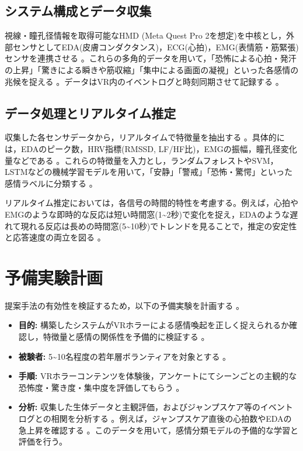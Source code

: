 \documentclass[paper=a4paper,fontsize=10pt,jafontscale=0.925,twocolumn]{jlreq}
\begin{document}
\subsection{システム構成とデータ収集}

視線・瞳孔径情報を取得可能なHMD (Meta Quest Pro 2を想定)を中核とし，外部センサとしてEDA(皮膚コンダクタンス)，ECG(心拍)，EMG(表情筋・筋緊張)センサを連携させる 。これらの多角的データを用いて，「恐怖による心拍・発汗の上昇」「驚きによる瞬きや筋収縮」「集中による画面の凝視」といった各感情の兆候を捉える 。データはVR内のイベントログと時刻同期させて記録する 。

\subsection{データ処理とリアルタイム推定}

収集した各センサデータから，リアルタイムで特徴量を抽出する 。具体的には，EDAのピーク数，HRV指標(RMSSD, LF/HF比)，EMGの振幅，瞳孔径変化量などである 。これらの特徴量を入力とし，ランダムフォレストやSVM，LSTMなどの機械学習モデルを用いて，「安静」「警戒」「恐怖・驚愕」といった感情ラベルに分類する 。

リアルタイム推定においては，各信号の時間的特性を考慮する。例えば，心拍やEMGのような即時的な反応は短い時間窓(1\textasciitilde2秒)で変化を捉え，EDAのような遅れて現れる反応は長めの時間窓(5\textasciitilde10秒)でトレンドを見ることで，推定の安定性と応答速度の両立を図る 。

\section{予備実験計画}

提案手法の有効性を検証するため，以下の予備実験を計画する 。

\begin{itemize}
    \item \textbf{目的:} 構築したシステムがVRホラーによる感情喚起を正しく捉えられるか確認し，特徴量と感情の関係性を予備的に検証する 。
    \item \textbf{被験者:} 5\textasciitilde10名程度の若年層ボランティアを対象とする 。
    \item \textbf{手順:} VRホラーコンテンツを体験後，アンケートにてシーンごとの主観的な恐怖度・驚き度・集中度を評価してもらう 。
    \item \textbf{分析:} 収集した生体データと主観評価，およびジャンプスケア等のイベントログとの相関を分析する 。例えば，ジャンプスケア直後の心拍数やEDAの急上昇を確認する 。このデータを用いて，感情分類モデルの予備的な学習と評価を行う。
\end{itemize}
\end{document}
